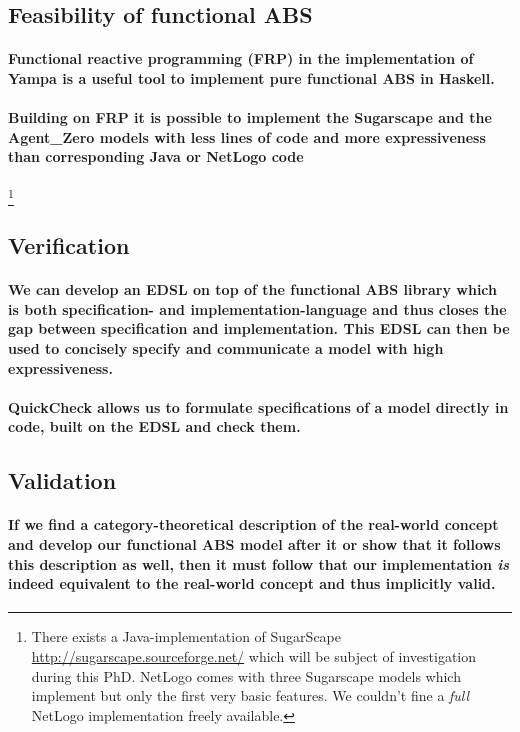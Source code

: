 \subsection{Feasibility of functional ABS}
\paragraph{Functional reactive programming (FRP) in the implementation of Yampa is a useful tool to implement pure functional ABS in Haskell.}
\paragraph{Building on FRP it is possible to implement the Sugarscape and the Agent\_Zero models with less lines of code and more expressiveness than corresponding Java or NetLogo code} 
\footnote{There exists a Java-implementation of SugarScape \url{http://sugarscape.sourceforge.net/} which will be subject of investigation during this PhD. NetLogo comes with three Sugarscape models which implement but only the first very basic features. We couldn't fine a \textit{full} NetLogo implementation freely available.}

\subsection{Verification}
\paragraph{We can develop an EDSL on top of the functional ABS library which is both specification- and implementation-language and thus closes the gap between specification and implementation. This EDSL can then be used to concisely specify and communicate a model with high expressiveness.}
\paragraph{QuickCheck allows us to formulate specifications of a model directly in code, built on the EDSL and check them.}

\subsection{Validation}
\paragraph{If we find a category-theoretical description of the real-world concept and develop our functional ABS model after it or show that it follows this description as well, then it must follow that our implementation \textit{is} indeed equivalent to the real-world concept and thus implicitly valid.}
